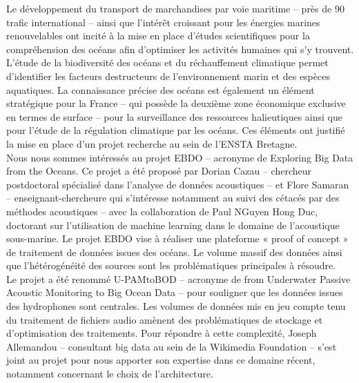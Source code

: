 \documentclass[a4paper]{article}
\begin{document}
Le développement du transport de marchandises par voie maritime – près de 90 %
trafic international – ainsi que l’intérêt croissant pour les énergies marines renouvelables ont
incité à la mise en place d’études scientifiques pour la compréhension des océans afin d’optimiser
les activités humaines qui s’y trouvent. L’étude de la biodiversité des océans et du réchauffement
climatique permet d’identifier les facteurs destructeurs de l’environnement marin et des espèces
aquatiques. La connaissance précise des océans est également un élément stratégique pour la
France – qui possède la deuxième zone économique exclusive en termes de surface – pour la
surveillance des ressources halieutiques ainsi que pour l’étude de la régulation climatique par les
océans. Ces éléments ont justifié la mise en place d’un projet recherche au sein de l’ENSTA
Bretagne.
\\

Nous nous sommes intéressés au projet EBDO – acronyme de Exploring Big Data from the
Oceans. Ce projet a été proposé par Dorian Cazau – chercheur postdoctoral spécialisé dans
l’analyse de données acoustiques – et Flore Samaran – enseignant-chercheure qui s’intéresse
notamment au suivi des cétacés par des méthodes acoustiques – avec la collaboration de Paul
NGuyen Hong Duc, doctorant sur l’utilisation de machine learning dans le domaine de l’acoustique
sous-marine. Le projet EBDO vise à réaliser une plateforme « proof of concept » de traitement de
données issues des océans. Le volume massif des données ainsi que l’hétérogénéité des sources
sont les problématiques principales à résoudre.
\\

Le projet a été renommé U-PAMtoBOD – acronyme de from Underwater Passive Acoustic
Monitoring to Big Ocean Data – pour souligner que les données issues des hydrophones sont
centrales. Les volumes de données mis en jeu compte tenu du traitement de fichiers audio
amènent des problématiques de stockage et d’optimisation des traitements. Pour répondre à
cette complexité, Joseph Allemandou – consultant big data au sein de la Wikimedia Foundation –
s’est joint au projet pour nous apporter son expertise dans ce domaine récent, notamment
concernant le choix de l’architecture.
\\
\end{document}
